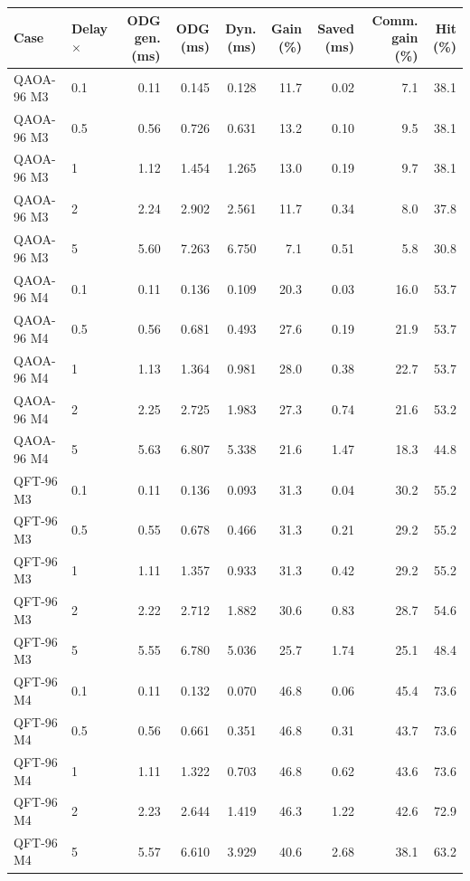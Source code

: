 \begin{tabular}{llrrrrrrr}
\toprule
Case & Delay $\times$ & ODG gen. (ms) & ODG (ms) & Dyn. (ms) & Gain (\%) & Saved (ms) & Comm. gain (\%) & Hit (\%) \\
\midrule
QAOA-96 M3 & 0.1 & 0.11 & 0.145 & 0.128 & 11.7 & 0.02 & 7.1 & 38.1 \\
QAOA-96 M3 & 0.5 & 0.56 & 0.726 & 0.631 & 13.2 & 0.10 & 9.5 & 38.1 \\
QAOA-96 M3 & 1 & 1.12 & 1.454 & 1.265 & 13.0 & 0.19 & 9.7 & 38.1 \\
QAOA-96 M3 & 2 & 2.24 & 2.902 & 2.561 & 11.7 & 0.34 & 8.0 & 37.8 \\
QAOA-96 M3 & 5 & 5.60 & 7.263 & 6.750 & 7.1 & 0.51 & 5.8 & 30.8 \\
QAOA-96 M4 & 0.1 & 0.11 & 0.136 & 0.109 & 20.3 & 0.03 & 16.0 & 53.7 \\
QAOA-96 M4 & 0.5 & 0.56 & 0.681 & 0.493 & 27.6 & 0.19 & 21.9 & 53.7 \\
QAOA-96 M4 & 1 & 1.13 & 1.364 & 0.981 & 28.0 & 0.38 & 22.7 & 53.7 \\
QAOA-96 M4 & 2 & 2.25 & 2.725 & 1.983 & 27.3 & 0.74 & 21.6 & 53.2 \\
QAOA-96 M4 & 5 & 5.63 & 6.807 & 5.338 & 21.6 & 1.47 & 18.3 & 44.8 \\
QFT-96 M3 & 0.1 & 0.11 & 0.136 & 0.093 & 31.3 & 0.04 & 30.2 & 55.2 \\
QFT-96 M3 & 0.5 & 0.55 & 0.678 & 0.466 & 31.3 & 0.21 & 29.2 & 55.2 \\
QFT-96 M3 & 1 & 1.11 & 1.357 & 0.933 & 31.3 & 0.42 & 29.2 & 55.2 \\
QFT-96 M3 & 2 & 2.22 & 2.712 & 1.882 & 30.6 & 0.83 & 28.7 & 54.6 \\
QFT-96 M3 & 5 & 5.55 & 6.780 & 5.036 & 25.7 & 1.74 & 25.1 & 48.4 \\
QFT-96 M4 & 0.1 & 0.11 & 0.132 & 0.070 & 46.8 & 0.06 & 45.4 & 73.6 \\
QFT-96 M4 & 0.5 & 0.56 & 0.661 & 0.351 & 46.8 & 0.31 & 43.7 & 73.6 \\
QFT-96 M4 & 1 & 1.11 & 1.322 & 0.703 & 46.8 & 0.62 & 43.6 & 73.6 \\
QFT-96 M4 & 2 & 2.23 & 2.644 & 1.419 & 46.3 & 1.22 & 42.6 & 72.9 \\
QFT-96 M4 & 5 & 5.57 & 6.610 & 3.929 & 40.6 & 2.68 & 38.1 & 63.2 \\
\bottomrule
\end{tabular}
